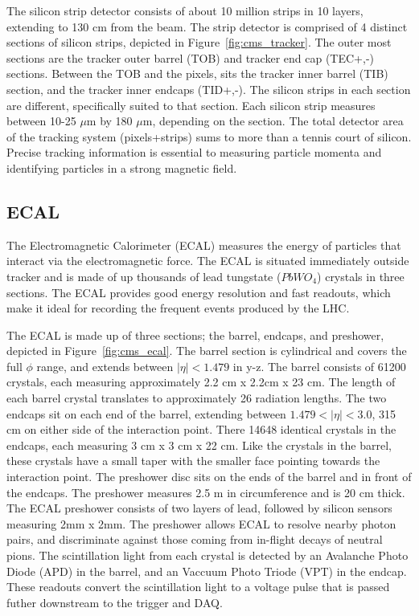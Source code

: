 The silicon strip detector consists of about 10 million strips in 10 layers, extending to 130 cm from the beam. 
The strip detector is comprised of 4 distinct sections of silicon strips, depicted in
Figure~\ref{fig:cms_tracker}. The outer most sections are the tracker outer barrel (TOB) and tracker end cap (TEC+,-) sections. Between the TOB and the pixels, sits the tracker
inner barrel (TIB) section, and the tracker inner endcaps (TID+,-). The silicon strips in each section are different, specifically suited to that section.
Each silicon strip measures between 10-25 $\mu$m by 180 $\mu$m, depending on the section. The total detector area of the tracking system (pixels+strips) sums to more than
a tennis court of silicon. Precise tracking information is essential to measuring particle momenta and identifying particles in a strong magnetic field.

\subsection{ECAL}
The Electromagnetic Calorimeter (ECAL) measures the energy of particles that interact via the electromagnetic force. The ECAL is situated immediately outside tracker
and is made of up thousands of lead tungstate ($PbWO_{4}$) crystals in three sections. The ECAL provides good energy resolution and fast readouts,
which make it ideal for recording the frequent events produced by the LHC. 

The ECAL is made up of three sections; the barrel, endcaps, and preshower, depicted in Figure~\ref{fig:cms_ecal}. The barrel section is cylindrical and covers the full $\phi$
range, and extends between $|\eta| < 1.479$ in y-z. The barrel consists of 61200 crystals, each measuring approximately 2.2 cm x 2.2cm x 23 cm. The length of each barrel
crystal translates to approximately 26 radiation lengths. The two endcaps sit on each end of the barrel, extending between $1.479 < |\eta|< 3.0$, 315 cm on either side of
the interaction point. There 14648 identical crystals in the endcaps, each measuring 3 cm x 3 cm x 22 cm. Like the crystals in the barrel, these crystals have a small taper
with the smaller face pointing towards the interaction point. The preshower disc sits on the ends of the barrel and in front of the endcaps. The preshower measures 2.5 m in
circumference and is 20 cm thick. The ECAL preshower consists of two layers
of lead, followed by silicon sensors measuring 2mm x 2mm. The preshower allows ECAL to resolve nearby photon pairs, and discriminate against those coming from in-flight decays
of neutral pions. The scintillation light from each crystal is detected by an Avalanche Photo Diode (APD) in the barrel, and an Vaccuum Photo Triode (VPT) in the endcap.
These readouts convert the scintillation light to a voltage pulse that is passed futher downstream to the trigger and DAQ. 


